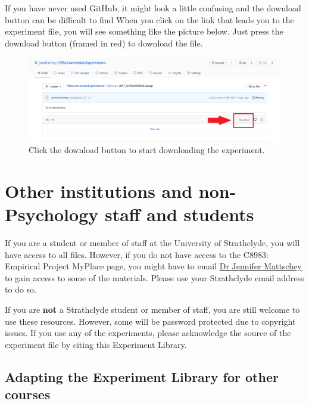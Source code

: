 \documentclass[
]{book}
\begin{document}
If you have never used GitHub, it might look a little confusing and the download button can be difficult to find When you click on the link that leads you to the experiment file, you will see something like the picture below. Just press the download button (framed in red) to download the file.

\begin{figure}

{\centering \includegraphics[width=0.95\linewidth]{images/opensesame/download} 

}

\caption{Click the download button to start downloading the experiment.}\label{fig:Figure0-2}
\end{figure}

\hypertarget{other-institutions-and-non-psychology-staff-and-students}{%
\section{Other institutions and non-Psychology staff and students}\label{other-institutions-and-non-psychology-staff-and-students}}

If you are a student or member of staff at the University of Strathclyde, you will have access to all files. However, if you do not have access to the C8983: Empirical Project MyPlace page, you might have to email \href{jennifer.mattschey@strath.ac}{Dr Jennifer Mattschey} to gain access to some of the materials. Please use your Strathclyde email address to do so.

If you are \textbf{not} a Strathclyde student or member of staff, you are still welcome to use these resources. However, some will be password protected due to copyright issues. If you use any of the experiments, please acknowledge the source of the experiment file by citing this Experiment Library.

\hypertarget{adapting-the-experiment-library-for-other-courses}{%
\subsection{Adapting the Experiment Library for other courses}\label{adapting-the-experiment-library-for-other-courses}}
\end{document}
